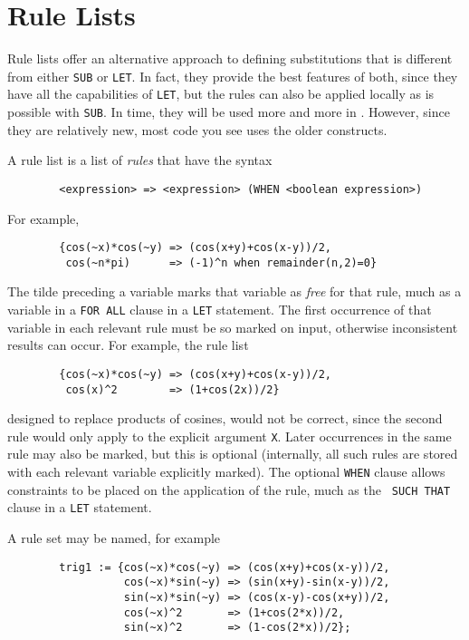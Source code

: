 \section{Rule Lists} 

Rule lists offer an alternative approach to defining substitutions that is
different from either {\tt SUB} or {\tt LET}.  In fact, they provide the
best features of both, since they have all the capabilities of {\tt LET},
but the rules can also be applied locally as is possible with {\tt SUB}.
In time, they will be used more and more in {\REDUCE}.  However, since they
are relatively new, most {\REDUCE} code you see uses the older constructs.

A rule list is a list of {\em rules} that have the syntax
\begin{verbatim}
        <expression> => <expression> (WHEN <boolean expression>)
\end{verbatim}
For example,
\begin{verbatim}
        {cos(~x)*cos(~y) => (cos(x+y)+cos(x-y))/2,
         cos(~n*pi)      => (-1)^n when remainder(n,2)=0}
\end{verbatim}

The tilde preceding a variable marks that variable as {\em free} for that
rule, much as a variable in a {\tt FOR ALL} clause in a {\tt LET}
statement.  The first occurrence of that variable in each relevant rule
must be so marked on input, otherwise inconsistent results can occur.
For example, the rule list
\begin{verbatim}
        {cos(~x)*cos(~y) => (cos(x+y)+cos(x-y))/2,
         cos(x)^2        => (1+cos(2x))/2}
\end{verbatim}
designed to replace products of cosines, would not be correct, since the
second rule would only apply to the explicit argument {\tt X}.  Later
occurrences in the same rule may also be marked, but this is optional
(internally, all such rules are stored with each relevant variable
explicitly marked).  The optional {\tt WHEN}  clause allows
constraints to be placed on the application of the rule, much as the {\tt
SUCH THAT} clause in a {\tt LET} statement.

A rule set may be named, for example
\begin{verbatim}
        trig1 := {cos(~x)*cos(~y) => (cos(x+y)+cos(x-y))/2,
                  cos(~x)*sin(~y) => (sin(x+y)-sin(x-y))/2,
                  sin(~x)*sin(~y) => (cos(x-y)-cos(x+y))/2,
                  cos(~x)^2       => (1+cos(2*x))/2,
                  sin(~x)^2       => (1-cos(2*x))/2};
\end{verbatim}

